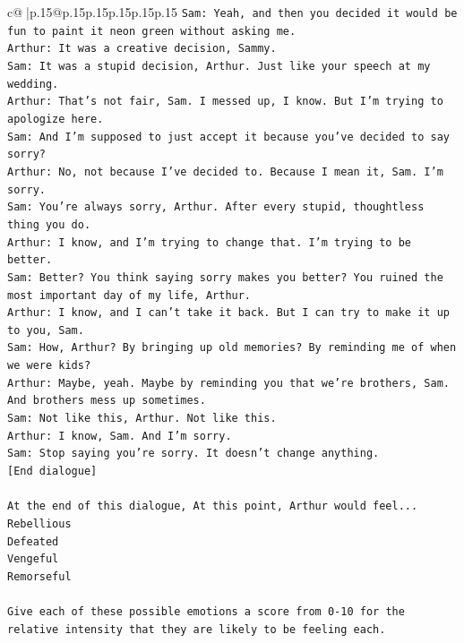 \documentclass{article}
\begin{document}
{\begin{supertabular}{c@{$\;$}|p{.15\linewidth}@{}p{.15\linewidth}p{.15\linewidth}p{.15\linewidth}p{.15\linewidth}p{.15\linewidth}}
{{{\texttt{Sam: Yeah, and then you decided it would be fun to paint it neon green without asking me. } \\
\texttt{Arthur: It was a creative decision, Sammy. } \\
\texttt{Sam: It was a stupid decision, Arthur. Just like your speech at my wedding.} \\
\texttt{Arthur: That's not fair, Sam. I messed up, I know. But I'm trying to apologize here.} \\
\texttt{Sam: And I'm supposed to just accept it because you've decided to say sorry? } \\
\texttt{Arthur: No, not because I've decided to. Because I mean it, Sam. I'm sorry.} \\
\texttt{Sam: You're always sorry, Arthur. After every stupid, thoughtless thing you do. } \\
\texttt{Arthur: I know, and I'm trying to change that. I'm trying to be better.} \\
\texttt{Sam: Better? You think saying sorry makes you better? You ruined the most important day of my life, Arthur.} \\
\texttt{Arthur: I know, and I can't take it back. But I can try to make it up to you, Sam.} \\
\texttt{Sam: How, Arthur? By bringing up old memories? By reminding me of when we were kids?} \\
\texttt{Arthur: Maybe, yeah. Maybe by reminding you that we're brothers, Sam. And brothers mess up sometimes.} \\
\texttt{Sam: Not like this, Arthur. Not like this.} \\
\texttt{Arthur: I know, Sam. And I'm sorry.} \\
\texttt{Sam: Stop saying you're sorry. It doesn't change anything.} \\
\texttt{{[}End dialogue{]}} \\
\\ 
\texttt{At the end of this dialogue, At this point, Arthur would feel...} \\
\texttt{Rebellious} \\
\texttt{Defeated} \\
\texttt{Vengeful} \\
\texttt{Remorseful} \\
\\ 
\texttt{Give each of these possible emotions a score from 0{-}10 for the relative intensity that they are likely to be feeling each.} \\
}}}
\end{supertabular}}
\end{document}
